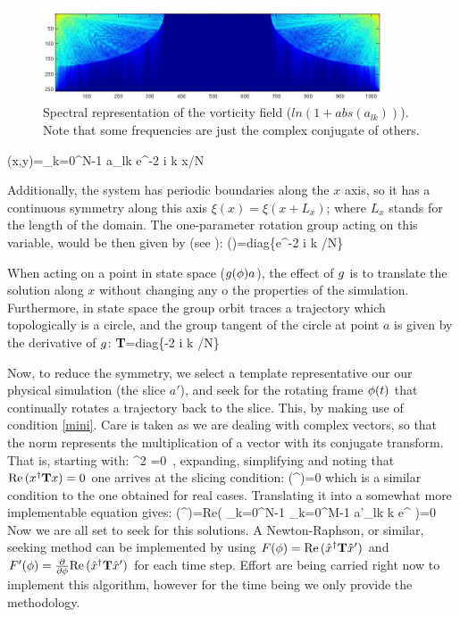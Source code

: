     \begin{figure}[t]
    \begin{center}
    \includegraphics[width=0.9\textwidth, clip=true]{fourier_example}
    \end{center}
    \caption{Spectral representation of the vorticity field
    ($ln(1+abs(a_{lk}))$). Note that some frequencies are just the complex
    conjugate of others.}
    \label{f:fouriervort3}
    \end{figure}

    \beq
    \xi(x,y)=\sum_{k=0}^{N-1} a_{lk} e^{-2 i \pi k x/N}

Additionally, the system has periodic boundaries along the $x$ axis, so
it has a continuous symmetry along this axis $\xi(x)=\xi(x+L_x)$; where
$L_x$ stands for the length of the domain. The one-parameter rotation
group acting on this variable, would be then given by (see
):
\beq
\LieEl(\gSpace)=\textrm{diag}\{e^{-2 i \pi k \gSpace/N}\}

When acting on a point in state space ($g({\bf \phi}) a$), the effect
of $g$ is to translate the solution along $x$ without changing any o
the properties of the simulation. Furthermore, in state space the group
orbit traces a trajectory which topologically is a circle, and the group
tangent of the circle at point $a$ is given by the derivative of
$g$:
\beq
\textbf{T}=\textrm{diag}\{-2 i \pi k /N\}

Now, to reduce the symmetry, we select a template representative our our
physical simulation (the slice $a'$), and seek for the rotating frame
${\bf \phi}(t)$ that continually rotates a trajectory back to the slice.
This, by making use of condition \ref{mini}. Care is taken as we are
dealing with complex vectors, so that the norm represents the
multiplication of a vector with its conjugate transform. That is,
starting with:
\beq
\frac{\partial}{\partial \gSpace} \norm{\ssp-\LieEl\slicep}^2 =0
\,,
expanding, simplifying and noting that ${\rm Re}\,(x^\dagger \mathbf{T} x)=0$ one
arrives at the slicing condition:
\beq
    \Re(\sspRed^\dagger \Lg \slicep)=0
which is a similar condition to the one obtained for real cases.
Translating it into a somewhat more implementable equation gives:
\beq
    \Re(\sspRed^\dagger \Lg \slicep)=Re\left( \sum_{k=0}^{N-1} \sum_{k=0}^{M-1}  a'_{lk} k e^{ \gSpace}\right)=0
Now we are all set to seek for this solutions. A Newton-Raphson, or
similar, seeking method can be implemented by using
$F({\bf \phi})={\rm Re}\,(\hat{x}^\dagger \mathbf{T} {\hat{x}'})$ and
$F'({\bf \phi})=\frac{\partial}{\partial {\bf \phi}}{\rm Re}\,(\hat{x}^\dagger \mathbf{T}
{\hat{x}'})$ for each time step. Effort are being carried right now to
implement this algorithm, however for the time being we only provide the
methodology.



